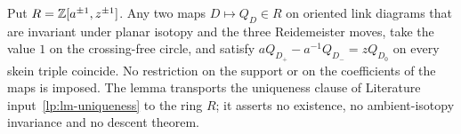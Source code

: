 \begin{lemma}
\label{lp:coefficient-transport}
Put $R=\mathbb Z[a^{\pm1},z^{\pm1}]$. Any two maps $D\mapsto Q_D\in R$ on oriented
link diagrams that are invariant under planar isotopy and the three
Reidemeister moves, take the value $1$ on the crossing-free circle, and
satisfy $aQ_{D_+}-a^{-1}Q_{D_-}=zQ_{D_0}$ on every skein triple coincide.
No restriction on the support or on the coefficients of the maps is imposed.
The lemma transports the uniqueness clause of Literature
input~\ref{lp:lm-uniqueness} to the ring $R$; it asserts no existence, no
ambient-isotopy invariance and no descent theorem.
\end{lemma}
